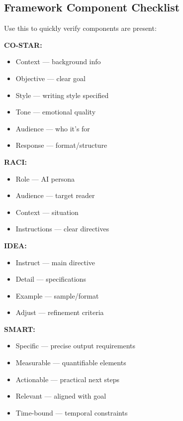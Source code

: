 \documentclass[11pt]{article}
\begin{document}
\subsection*{Framework Component Checklist}

Use this to quickly verify components are present:

\textbf{CO-STAR:}
\begin{itemize}
    \item[$\square$] Context --- background info
    \item[$\square$] Objective --- clear goal
    \item[$\square$] Style --- writing style specified
    \item[$\square$] Tone --- emotional quality
    \item[$\square$] Audience --- who it's for
    \item[$\square$] Response --- format/structure
\end{itemize}

\textbf{RACI:}
\begin{itemize}
    \item[$\square$] Role --- AI persona
    \item[$\square$] Audience --- target reader
    \item[$\square$] Context --- situation
    \item[$\square$] Instructions --- clear directives
\end{itemize}

\textbf{IDEA:}
\begin{itemize}
    \item[$\square$] Instruct --- main directive
    \item[$\square$] Detail --- specifications
    \item[$\square$] Example --- sample/format
    \item[$\square$] Adjust --- refinement criteria
\end{itemize}

\textbf{SMART:}
\begin{itemize}
    \item[$\square$] Specific --- precise output requirements
    \item[$\square$] Measurable --- quantifiable elements
    \item[$\square$] Actionable --- practical next steps
    \item[$\square$] Relevant --- aligned with goal
    \item[$\square$] Time-bound --- temporal constraints
\end{itemize}
\end{document}
